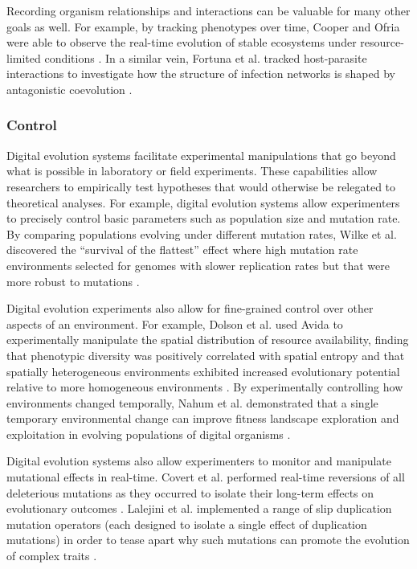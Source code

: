 Recording organism relationships and interactions can be valuable for many other goals as well.
For example, by tracking phenotypes over time, Cooper and Ofria were able to observe the real-time evolution of stable ecosystems under resource-limited conditions \citep{cooper_evolution_2002}.
In a similar vein, Fortuna et al. tracked host-parasite interactions to investigate how the structure of infection networks is shaped by antagonistic coevolution \citep{fortuna_coevolutionary_2019}.


\subsubsection{Control}

Digital evolution systems facilitate experimental manipulations that go beyond what is possible in laboratory or field experiments.
These capabilities allow researchers to empirically test hypotheses that would otherwise be relegated to theoretical analyses.
For example, digital evolution systems allow experimenters to precisely control basic parameters such as population size and mutation rate.
By comparing populations evolving under different mutation rates, Wilke et al. discovered the ``survival of the flattest'' effect where high mutation rate environments selected for genomes with slower replication rates but that were more robust to mutations \citep{wilke_flattest_2001}. 


Digital evolution experiments also allow for fine-grained control over other aspects of an environment.
For example, Dolson et al. used Avida to experimentally manipulate the spatial distribution of resource availability, finding that phenotypic diversity was positively correlated with spatial entropy and that spatially heterogeneous environments exhibited increased evolutionary potential relative to more homogeneous environments \citep{dolson_spatial_2017}.
By experimentally controlling how environments changed temporally, Nahum et al. demonstrated that a single temporary environmental change can improve fitness landscape exploration and exploitation in evolving populations of digital organisms \citep{nahum_improved_2017}.

Digital evolution systems also allow experimenters to monitor and manipulate mutational effects in real-time.
Covert et al. performed real-time reversions of all deleterious mutations as they occurred to isolate their long-term effects on evolutionary outcomes \citep{covert_experiments_2013}.
Lalejini et al. implemented a range of slip duplication mutation operators (each designed to isolate a single effect of duplication mutations) in order to tease apart why such mutations can promote the evolution of complex traits \citep{lalejini_gene_2017}.


